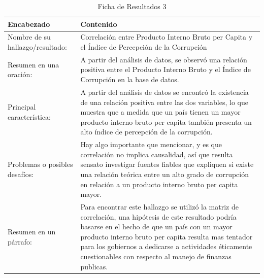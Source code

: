 \begin{table}[H]
    \caption{Ficha de Resultados 3}
    \begin{center}
        \begin{tabular}{  m{3cm} | m{12cm}  }
        \hline\textbf{ Encabezado} & \textbf{Contenido }\\ \hline
        Nombre de su hallazgo/resultado: &  Correlación entre Producto Interno Bruto per Capita y el Índice de Percepción de la Corrupción\\ \hline
        Resumen en una oración: &  A partir del análisis de datos, se observó una relación positiva  entre el Producto Interno Bruto y el Índice de Corrupción en la base de datos.
\\ \hline
        Principal característica: &  A partir del análisis de datos se encontró la existencia de una relación positiva entre las dos variables, lo que muestra que a medida que un país tienen un mayor producto interno bruto per capita también presenta un alto índice de percepción de la corrupción.\\ \hline
        Problemas o posibles desafíos: &  Hay algo importante que mencionar, y es que correlación no implica causalidad, así que resulta sensato investigar fuentes fiables que expliquen si existe una relación teórica entre un alto grado de corrupción en relación a un producto interno bruto per capita mayor. \\ \hline
        Resumen en un párrafo: & Para encontrar este hallazgo se utilizó la matriz de correlación, una hipótesis de este resultado podría basarse en el hecho de que un país con un mayor producto interno bruto per capita resulta mas tentador para los gobiernos a dedicarse a actividades éticamente cuestionables con respecto al manejo de finanzas publicas. \\ \hline
        \end{tabular}
    \end{center}
\end{table}

